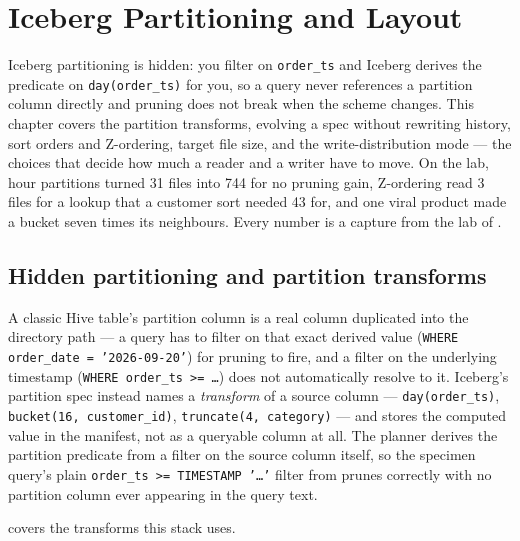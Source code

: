 \chapter{Iceberg Partitioning and Layout}
\label{ch:iceberg-layout}

\begin{chapterintro}
Iceberg partitioning is hidden: you filter on \texttt{order\_ts} and Iceberg
derives the predicate on \texttt{day(order\_ts)} for you, so a query never
references a partition column directly and pruning does not break when the
scheme changes. This chapter covers the partition transforms, evolving a spec
without rewriting history, sort orders and Z-ordering, target file size, and the
write-distribution mode --- the choices that decide how much a reader and a
writer have to move. On the lab, hour partitions turned 31 files into 744 for
no pruning gain, Z-ordering read 3 files for a lookup that a customer sort
needed 43 for, and one viral product made a bucket seven times its neighbours.
Every number is a capture from the lab of .
\end{chapterintro}

\section{Hidden partitioning and partition transforms}
\label{sec:ice-partitioning}

A classic Hive table's partition column is a real column duplicated into the
directory path --- a query has to filter on that exact derived value
(\texttt{WHERE order\_date = '2026-09-20'}) for pruning to fire, and a filter
on the underlying timestamp (\texttt{WHERE order\_ts >= \ldots}) does not
automatically resolve to it. Iceberg's partition spec instead names a
\emph{transform} of a source column --- \texttt{day(order\_ts)},
\texttt{bucket(16, customer\_id)}, \texttt{truncate(4, category)} --- and stores the
computed value in the manifest, not as a queryable column at all. The planner
derives the partition predicate from a filter on the source column itself, so
the specimen query's plain \texttt{order\_ts >= TIMESTAMP '\ldots'} filter
from  prunes correctly with no partition column ever
appearing in the query text.

 covers the transforms this stack uses.

